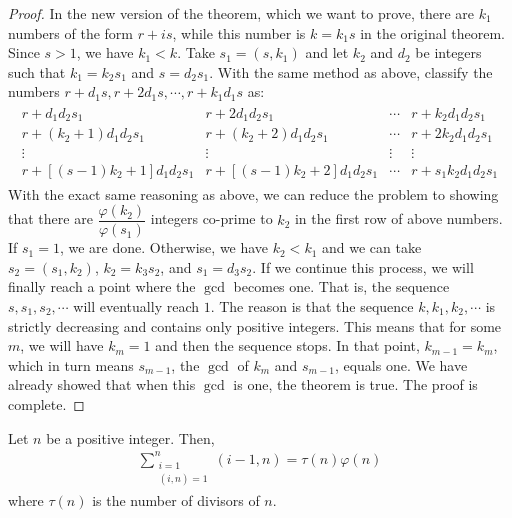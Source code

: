 \begin{proof}
		In the new version of the theorem, which we want to prove, there are $k_1$ numbers of the form $r+is$, while this number is $k=k_1s$ in the original theorem. Since $s>1$, we have $k_1<k$. Take $s_1 = (s,k_1)$ and let $k_2$ and $d_2$ be integers such that $k_1 = k_2s_1$ and $s=d_2s_1$. With the same method as above, classify the numbers $r+d_1s, r+2d_1s, \cdots, r+k_1d_1s$ as:
			\begin{align*}
				\begin{matrix}
					r+d_1d_2s_1&r+2d_1d_2s_1&\cdots&r+k_2d_1d_2s_1\\
					r+(k_2+1)d_1d_2s_1&r+(k_2+2)d_1d_2s_1&\cdots&r+2k_2d_1d_2s_1\\
					\vdots&\vdots&\vdots&\vdots\\
					r+[(s-1)k_2+1]d_1d_2s_1&r+[(s-1)k_2+2]d_1d_2s_1&\cdots&r+s_1k_2d_1d_2s_1
				\end{matrix}
			\end{align*}
		With the exact same reasoning as above, we can reduce the problem to showing that there are $\dfrac{\varphi(k_2)}{\varphi(s_1)}$ integers co-prime to $k_2$ in the first row of above numbers. If $s_1=1$, we are done. Otherwise, we have $k_2<k_1$ and we can take $s_2=(s_1,k_2)$, $k_2=k_3s_2$, and $s_1=d_3s_2$. If we continue this process, we will finally reach a point where the $\gcd$ becomes one. That is, the sequence $s, s_1, s_2, \cdots$ will eventually reach $1$. The reason is that the sequence $k, k_1, k_2, \cdots$ is strictly decreasing and contains only positive integers. This means that for some $m$, we will have $k_m=1$ and then the sequence stops. In that point, $k_{m-1} = k_m$, which in turn means $s_{m-1}$, the $\gcd$ of $k_{m}$ and $s_{m-1}$, equals one. We have already showed that when this $\gcd$ is one, the theorem is true. The proof is complete.
	\end{proof}

	\begin{theorem}
		Let $n$ be a positive integer. Then,
			\begin{align*}
				\sum_{\substack{i=1\\(i,n)=1}}^{n}(i-1,n)=\tau(n)\varphi(n)
			\end{align*}
		where $\tau(n)$ is the number of divisors of $n$.
	\end{theorem}

